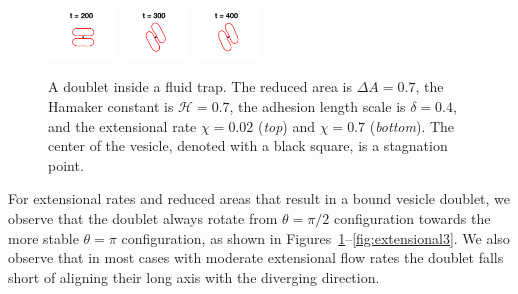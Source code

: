 \documentclass[prf,superscriptaddress,showpacs]{revtex4-1}
\begin{document}
\begin{figure}[htp]
  \includegraphics[width = 0.16\textwidth,trim={4cm 2cm 4cm 1cm},clip]{figs/extensional_adR4em1adS7em1Chi7em2_ra070_image03.png}
  \includegraphics[width = 0.16\textwidth,trim={4cm 2cm 4cm 1cm},clip]{figs/extensional_adR4em1adS7em1Chi7em2_ra070_image04.png}
  \includegraphics[width = 0.16\textwidth,trim={4cm 2cm 4cm 1cm},clip]{figs/extensional_adR4em1adS7em1Chi7em2_ra070_image05.png}
  \caption{\label{fig:extensional1} A doublet inside a fluid trap.  The
  reduced area is $\Delta A = 0.7$, the Hamaker constant is $\mathcal{H} =
  0.7$, the adhesion length scale is $\delta = 0.4$, and the extensional
  rate $\chi = 0.02$ ({\em top}) and $\chi=0.7$ ({\em bottom}).  The center of the vesicle, denoted with a
  black square, is a stagnation point.}
  \end{figure}
  For extensional rates and reduced areas that result in a bound vesicle doublet, 
we observe that the doublet always rotate from $\theta=\pi/2$ configuration towards
the more stable $\theta=\pi$ configuration, as shown in Figures~\ref{fig:extensional1}--\ref{fig:extensional3}.
We also observe that in most cases with moderate extensional flow rates the doublet falls short of 
aligning their long axis with the diverging direction.

  
\end{document}
